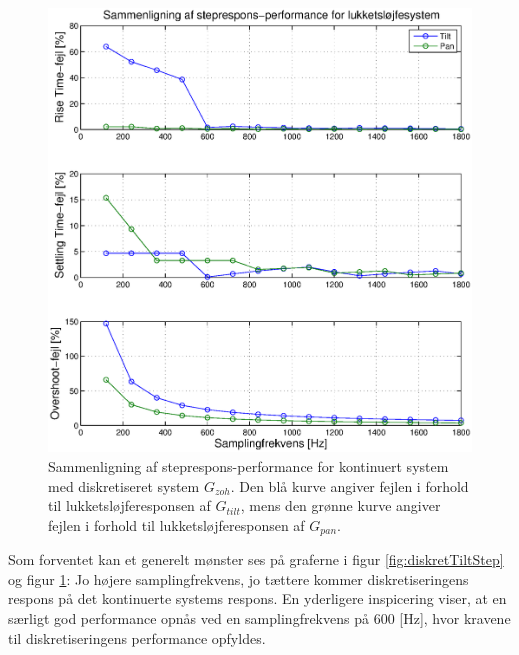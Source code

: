 \begin{figure}[!th]
\centering
	\includegraphics[width=1\textwidth]{./graphics/diskretStepFreq.eps}
\captionsetup{width=0.9\textwidth}
\caption[Sammenligning af performance mellem kontinuert og diskretiseret system]
{Sammenligning af steprespons-performance for kontinuert system med diskretiseret system \(G_{zoh}\).
Den blå kurve angiver fejlen i forhold til lukketsløjferesponsen af $G_{tilt}$,
mens den grønne kurve angiver fejlen i forhold til lukketsløjferesponsen af $G_{pan}$.
}
\label{fig:diskretStepFreq}
\end{figure}

Som forventet kan et generelt mønster ses på graferne i figur \ref{fig:diskretTiltStep} og figur \ref{fig:diskretStepFreq}:
Jo højere samplingfrekvens, jo tættere kommer diskretiseringens respons på det kontinuerte systems respons.
En yderligere inspicering viser, at en særligt god performance opnås ved en samplingfrekvens på 600 [Hz],
hvor kravene til diskretiseringens performance opfyldes.

